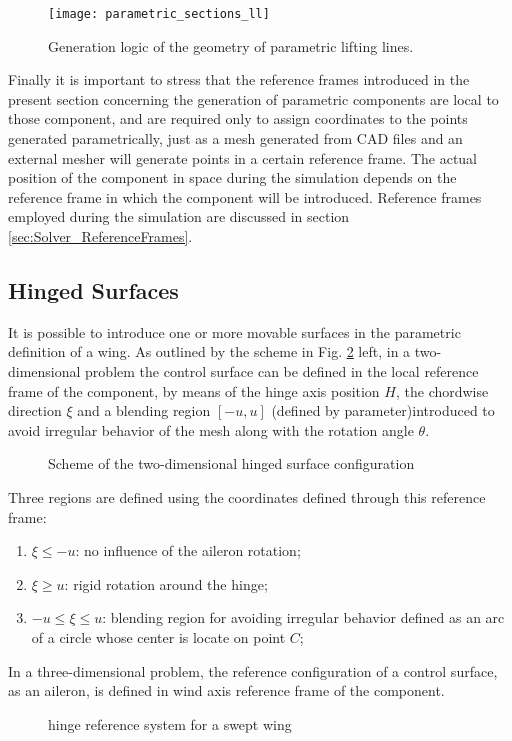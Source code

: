\begin{figure}[h]
\centering
\texttt{[image: parametric\_sections\_ll]}
\caption{Generation logic of the geometry of parametric lifting lines.}
\label{fig:parametric_sections_ll}
\end{figure}

Finally it is important to stress that the reference frames introduced in the present section concerning the generation of parametric components are local to those component, and are required only to assign coordinates to the points generated parametrically, just as a mesh generated from CAD files and an external mesher will generate points in a certain reference frame. The actual position of the component in space during the simulation depends on the reference frame in which the component will be introduced. Reference frames employed during the simulation are discussed in section \ref{sec:Solver_ReferenceFrames}.

\subsection{Hinged Surfaces}
\label{sec:Hinge_surfaces}
It is possible to introduce one or more movable surfaces in the parametric definition of a wing.
As outlined by the scheme in Fig. \ref{fig:hinge} left, in a two-dimensional problem the control surface can be defined in the local reference frame of the component, by means of the hinge axis position $H$, the chordwise direction $\xi$ and a blending region $[-u, u]$ (defined by  parameter)introduced to avoid irregular behavior of the mesh along with the rotation angle $\theta$.
\begin{figure}[htbp]
\vspace{-3cm}
\centering
    \def\svgwidth{\columnwidth}
    
    \caption{Scheme of the two-dimensional hinged surface configuration}
    \label{fig:hinge}
\end{figure}
Three regions are defined using the coordinates defined through this reference frame:
\begin{enumerate}
 \item $\xi \leq -u$: no influence of the aileron rotation;
 \item $\xi \geq  u$: rigid rotation around the hinge;
 \item $-u \le \xi \le  u$: blending region for avoiding irregular behavior defined as an arc of a circle whose center is locate on point $C$;
\end{enumerate}
In a three-dimensional problem, the reference configuration of a control surface, as an aileron, is defined in wind axis reference frame of the component.
\begin{figure}[htbp]
    \centering
    \def\svgwidth{\columnwidth}
    
    \caption{hinge reference system for a swept wing}
     \label{fig:hingeref}
\end{figure}

